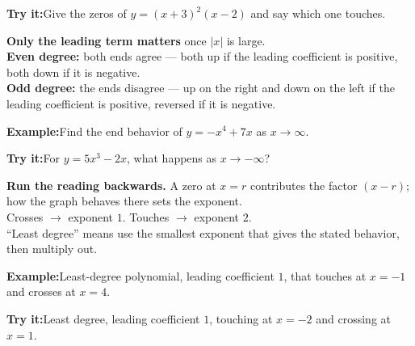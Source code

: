 \documentclass[12pt]{article}
\begin{document}
\begin{tryitbox}
\textbf{Try it:}\quad Give the zeros of $y = (x+3)^2(x-2)$ and say which one
touches.\\[2pt]
\end{tryitbox}


\begin{formulabox}
\textbf{Only the leading term matters} once $|x|$ is large.\\[3pt]
\textbf{Even degree:} both ends agree --- both up if the leading coefficient is
positive, both down if it is negative.\\[3pt]
\textbf{Odd degree:} the ends disagree --- up on the right and down on the left
if the leading coefficient is positive, reversed if it is negative.
\end{formulabox}

\begin{examplebox}
\textbf{Example:}\quad Find the end behavior of $y = -x^4 + 7x$ as
$x \to \infty$.
\end{examplebox}

\begin{tryitbox}
\textbf{Try it:}\quad For $y = 5x^3 - 2x$, what happens as $x \to -\infty$?\\[2pt]
\end{tryitbox}


\begin{formulabox}
\textbf{Run the reading backwards.} A zero at $x = r$ contributes the factor
$(x - r)$; how the graph behaves there sets the exponent.\\[3pt]
Crosses $\rightarrow$ exponent $1$. \quad Touches $\rightarrow$ exponent $2$.\\[3pt]
``Least degree'' means use the smallest exponent that gives the stated behavior,
then multiply out.
\end{formulabox}

\begin{examplebox}
\textbf{Example:}\quad Least-degree polynomial, leading coefficient $1$, that
touches at $x = -1$ and crosses at $x = 4$.
\end{examplebox}

\begin{tryitbox}
\textbf{Try it:}\quad Least degree, leading coefficient $1$, touching at
$x = -2$ and crossing at $x = 1$.\\[2pt]
\end{tryitbox}
\end{document}
